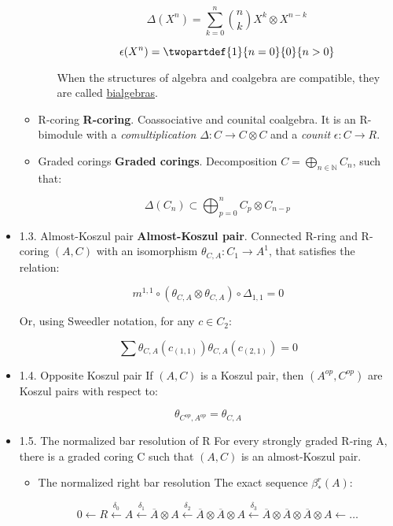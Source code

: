 \documentclass[11pt]{article}
\begin{document}
\begin{itemize}
\begin{itemize}
\begin{itemize}
\[\Delta(X^n) = \sum^n_{k=0} {n \choose k} X^k \otimes X^{n-k}\]

\[ \epsilon(X^n) = \twopartdef{1}{n=0}{0}{n>0}\]

When the structures of algebra and coalgebra are compatible, they
are called \href{https://en.wikipedia.org/wiki/Bialgebra}{bialgebras}.
\end{itemize}

\item R-coring
\label{sec-1-5-2-2-3}
\textbf{R-coring}. Coassociative and counital coalgebra. It is an R-bimodule 
with a \emph{comultiplication} $\Delta : C \longrightarrow C \otimes C$ and 
a \emph{counit} $\epsilon : C \longrightarrow R$.

\item Graded corings
\label{sec-1-5-2-2-4}
\textbf{Graded corings}. Decomposition $C = \bigoplus_{n \in \mathbb{N}} C_n$, 
such that:

\[\Delta(C_n) \subset \bigoplus_{p=0}^n C_p \otimes C_{n-p}\]
\end{itemize}

\item 1.3. Almost-Koszul pair
\label{sec-1-5-2-3}
\textbf{Almost-Koszul pair}. Connected R-ring and R-coring $(A,C)$ with an 
isomorphism $\theta_{C,A} : C_1 \longrightarrow A^1$, that satisfies the relation:

\[ m^{1,1} \circ (\theta_{C,A} \otimes \theta_{C,A}) \circ \Delta_{1,1}
= 0\]

Or, using Sweedler notation, for any $c \in C_2$:

\[ \sum \theta_{C,A}(c_{(1,1)}) \theta_{C,A}(c_{(2,1)}) = 0\]

\item 1.4. Opposite Koszul pair
\label{sec-1-5-2-4}
If $(A,C)$ is a Koszul pair, then $(A^{op},C^{op})$ are Koszul pairs with
respect to:

\[\theta_{C^{op},A^{op}} = \theta_{C,A}\]

\item 1.5. The normalized bar resolution of R
\label{sec-1-5-2-5}
For every strongly graded R-ring A, there is a graded coring C such that
$(A,C)$ is an almost-Koszul pair.

\begin{itemize}
\item The normalized right bar resolution
\label{sec-1-5-2-5-1}
The exact sequence $\beta_\ast^r(A)$:

\[ 0 \longleftarrow 
R \overset{\delta_0}\longleftarrow 
A \overset{\delta_1}\longleftarrow
\overline{A} \otimes A \overset{\delta_2}\longleftarrow
\overline{A} \otimes \overline{A} \otimes A \overset{\delta_3}\longleftarrow
\overline{A} \otimes \overline{A} \otimes \overline{A} \otimes A \longleftarrow
\dots
\]


\end{itemize}
\end{itemize}
\end{document}
